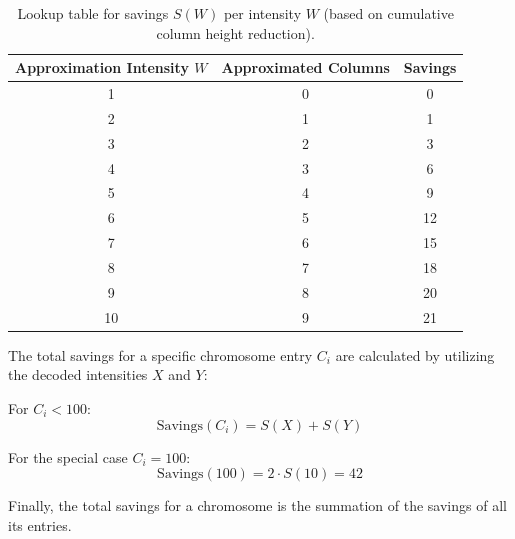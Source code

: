 \documentclass[a4paper,11pt]{article}
\begin{document}
\begin{table}[H]
  \centering
  \caption{Lookup table for savings $S(W)$ per intensity $W$ (based on cumulative column height reduction).}
  \label{tab:savings}
  \begin{tabular}{ccc}
    \toprule
    \textbf{Approximation Intensity $W$} & \textbf{Approximated Columns} & \textbf{Savings} \\
    \midrule
    1                                    & 0                             & 0                \\
    2                                    & 1                             & 1                \\
    3                                    & 2                             & 3                \\
    4                                    & 3                             & 6                \\
    5                                    & 4                             & 9                \\
    6                                    & 5                             & 12               \\
    7                                    & 6                             & 15               \\
    8                                    & 7                             & 18               \\
    9                                    & 8                             & 20               \\
    10                                   & 9                             & 21               \\
    \bottomrule
  \end{tabular}
\end{table}

The total savings for a specific chromosome entry $C_i$ are calculated by utilizing the decoded intensities $X$ and $Y$:

For $C_i < 100$:
\begin{equation}
  \text{Savings}(C_i) = S(X) + S(Y)
\end{equation}

For the special case $C_i = 100$:
\begin{equation}
  \text{Savings}(100) = 2 \cdot S(10) = 42
\end{equation}

Finally, the total savings for a chromosome is the summation of the savings of all its entries.
\end{document}
